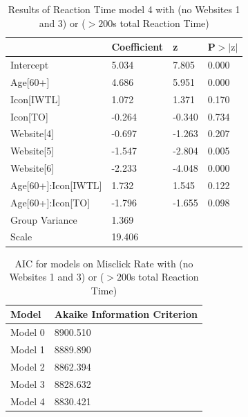 \documentclass[12pt,twoside]{reedthesis}
\begin{document}
\begin{table}[h!]
        \centering
        \begin{tabular}{| p{5cm} | p{2.5cm} | p{2.5cm} | p{2.5cm} |}
            \hline
            & Coefficient & z & P$>|\text{z}|$\\
            \hline
            Intercept & 5.034 & 7.805 & 0.000\\
            \hline
            Age[60+] & 4.686 & 5.951 & 0.000\\
            \hline
            Icon[IWTL] & 1.072 & 1.371 & 0.170\\
            \hline
            Icon[TO] & -0.264 & -0.340 & 0.734\\
            \hline
            Website[4] & -0.697 & -1.263 & 0.207\\
            \hline
            Website[5] & -1.547 & -2.804 & 0.005\\
            \hline
            Website[6] & -2.233 & -4.048 & 0.000\\
            \hline
            Age[60+]:Icon[IWTL] & 1.732 & 1.545 & 0.122\\
            \hline
            Age[60+]:Icon[TO] & -1.796 & -1.655 & 0.098\\
            Group Variance & 1.369 &&\\
            \hline
            Scale & 19.406 &&\\
            \hline
        \end{tabular}
        \caption{Results of Reaction Time model 4 with (no Websites 1 and 3) or ($>200$s total Reaction Time)}
    \end{table}

\begin{table}[h!]
        \centering
        \begin{tabular}{| p{3.5cm} | p{7.5cm} |}
            \hline
            Model & Akaike Information Criterion\\
            \hline
            Model 0 & 8900.510\\
            \hline
            Model 1 & 8889.890\\
            \hline
            Model 2 & 8862.394\\
            \hline
            Model 3 & 8828.632\\
            \hline
            Model 4 & 8830.421\\
            \hline
        \end{tabular}
        \caption{AIC for models on Misclick Rate with (no Websites 1 and 3) or ($>200$s total Reaction Time)}
    \end{table}
\end{document}
